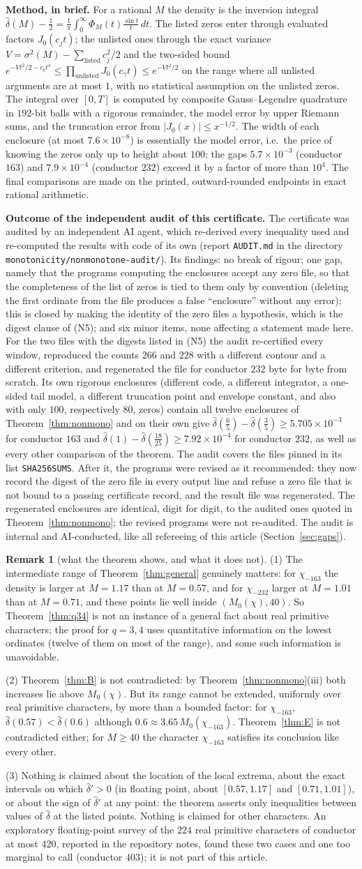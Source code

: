 \documentclass[11pt]{amsart}
\theoremstyle{definition}
\newtheorem{remark}[theorem]{Remark}
\numberwithin{equation}{section}
\newcommand{\hd}{\widehat\delta}
\newcommand{\NonmonoAuditOutcome}{%
The certificate was audited by an independent AI agent, which
re-derived every inequality used and re-computed the results with code
of its own (report \texttt{AUDIT.md} in the directory
\texttt{monotonicity/nonmonotone-audit/}). Its findings: no break of
rigour; one gap, namely that the programs computing the enclosures
accept any zero file, so that the completeness of the list of zeros is
tied to them only by convention (deleting the first ordinate from the
file produces a false ``enclosure'' without any error); this is closed
by making the identity of the zero files a hypothesis, which is the
digest clause of \textup{(N5)}; and six minor items, none affecting a
statement made here. For the two files with the digests listed in
\textup{(N5)} the audit re-certified every window, reproduced the
counts $266$ and $228$ with a different contour and a different
criterion, and regenerated the file for conductor $232$ byte for byte
from scratch. Its own rigorous enclosures (different code, a different
integrator, a one-sided tail model, a different truncation point and
envelope constant, and also with only $100$, respectively $80$, zeros)
contain all twelve enclosures of Theorem~\ref{thm:nonmono} and on their
own give $\hd(\tfrac65)-\hd(\tfrac35)\ge5.705\times10^{-3}$ for
conductor $163$ and $\hd(1)-\hd(\tfrac{18}{25})\ge7.92\times10^{-4}$
for conductor $232$, as well as every other comparison of the theorem.
The audit covers the files pinned in its list \texttt{SHA256SUMS}.
After it, the programs were revised as it recommended: they now
record the digest of the zero file in every output line and refuse a
zero file that is not bound to a passing certificate record, and the
result file was regenerated. The regenerated enclosures are identical,
digit for digit, to the audited ones quoted in
Theorem~\ref{thm:nonmono}; the revised programs were not re-audited.
The audit is internal and AI-conducted, like all refereeing of this
article (Section~\ref{sec:gaps}).}
\begin{document}
\noindent\textbf{Method, in brief.} For a rational $M$ the density is
the inversion integral
$\hd(M)-\tfrac12=\frac1\pi\int_0^\infty\Phi_M(t)\frac{\sin t}{t}\,dt$.
The listed zeros enter through evaluated factors $J_0(c_jt)$; the
unlisted ones through the exact variance
$V=\sigma^2(M)-\sum_{\mathrm{listed}}c_j^2/2$ and the two-sided bound
$e^{-Vt^2/2-c_bt^4}\le\prod_{\mathrm{unlisted}}J_0(c_\gamma t)\le e^{-Vt^2/2}$
on the range where all unlisted arguments are at most $1$, with no
statistical assumption on the unlisted zeros. The integral over
$[0,T]$ is computed by composite Gauss--Legendre quadrature in
$192$-bit balls with a rigorous remainder, the model error by upper
Riemann sums, and the truncation error from
$|J_0(x)|\le x^{-1/2}$. The width of each enclosure (at most
$7.6\times10^{-8}$) is essentially the model error, i.e.\ the price of
knowing the zeros only up to height about $100$; the gaps
$5.7\times10^{-3}$ (conductor $163$) and $7.9\times10^{-4}$
(conductor $232$) exceed it by a factor of more than $10^4$. The
final comparisons are made on the printed, outward-rounded endpoints
in exact rational arithmetic.

\medskip
\noindent\textbf{Outcome of the independent audit of this
certificate.} \NonmonoAuditOutcome

\begin{remark}[what the theorem shows, and what it does not]
\label{rem:nonmono}
(1) The intermediate range of Theorem~\ref{thm:general} genuinely
matters: for $\chi_{-163}$ the density is larger at $M=1.17$ than at
$M=0.57$, and for $\chi_{-232}$ larger at $M=1.01$ than at $M=0.71$,
and these points lie well inside $(M_0(\chi),40)$. So Theorem~\ref{thm:q34} is not an instance
of a general fact about real primitive characters; the proof for
$q=3,4$ uses quantitative information on the lowest ordinates (twelve
of them on most of the range), and some such information is unavoidable.

(2) Theorem~\ref{thm:B} is not contradicted: by
Theorem~\ref{thm:nonmono}(iii) both increases lie above $M_0(\chi)$.
But its range cannot be extended, uniformly over real primitive
characters, by more than a bounded factor: for $\chi_{-163}$,
$\hd(0.57)<\hd(0.6)$ although $0.6\approx3.65\,M_0(\chi_{-163})$.
Theorem~\ref{thm:E} is not contradicted either; for $M\ge40$ the
character $\chi_{-163}$ satisfies its conclusion like every other.

(3) Nothing is claimed about the location of the local extrema, about
the exact intervals on which $\hd'>0$ (in floating point, about
$[0.57,1.17]$ and $[0.71,1.01]$), or about the sign of $\hd'$ at any
point: the theorem asserts only inequalities between values of $\hd$
at the listed points. Nothing is claimed for other characters. An
exploratory floating-point survey of the $224$ real primitive
characters of conductor at most $420$, reported in the repository
notes, found these two cases and one too marginal to call
(conductor $403$); it is not part of this article.
\end{remark}
\end{document}
